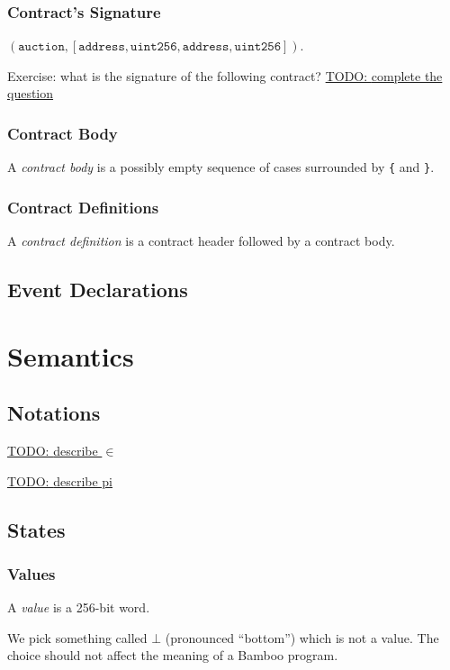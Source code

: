 \documentclass{book}
\newcommand{\todo}[1]{\underline{TODO: {#1}}}
\begin{document}
\subsection{Contract's Signature}

$(\mathtt{auction}, [\mathtt{address}, \mathtt{uint256}, \mathtt{address}, \mathtt{uint256}])$.

Exercise: what is the signature of the following contract?
\todo{complete the question}

\subsection{Contract Body}

A \textit{contract body} is a possibly empty sequence of cases surrounded by \texttt{\{} and \texttt{\}}.

\subsection{Contract Definitions}

A \textit{contract definition} is a contract header followed by a contract body.

\section{Event Declarations}

\chapter{Semantics}

\section{Notations}

\todo{describe $\in$}

\todo{describe pi}

\section{States}

\subsection{Values}

A \textit{value} is a 256-bit word.

We pick something called $\bot$ (pronounced ``bottom'') which is not a value.  The choice should not affect the meaning of a Bamboo program.
\end{document}

